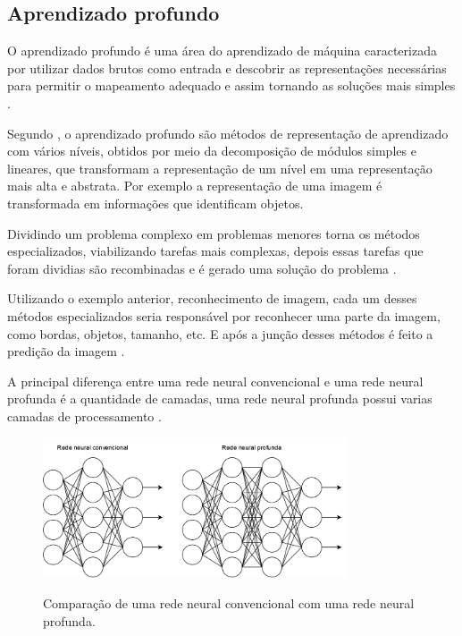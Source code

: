 \subsection{Aprendizado profundo}

O aprendizado profundo é uma área do aprendizado de máquina caracterizada por utilizar dados brutos como entrada e descobrir as representações necessárias para permitir o mapeamento adequado e assim tornando as soluções mais simples .

Segundo , o aprendizado profundo são métodos de representação de aprendizado com vários níveis, obtidos por meio da decomposição de módulos simples e lineares, que transformam a representação de um nível em uma representação mais alta e abstrata. Por exemplo a representação de uma imagem é transformada em informações que identificam objetos.

Dividindo um problema complexo em problemas menores torna os métodos especializados, viabilizando tarefas mais complexas, depois essas tarefas que foram dividias são recombinadas e é gerado uma solução do problema \cite{marti2017aprendizado}.

Utilizando o exemplo anterior, reconhecimento de imagem, cada um desses métodos especializados seria responsável por reconhecer uma parte da imagem, como bordas, objetos, tamanho, etc. E após a junção desses métodos é feito a predição da imagem \cite{marti2017aprendizado}.

A principal diferença entre uma rede neural convencional e uma rede neural profunda é a quantidade de camadas, uma rede neural profunda possui varias camadas de processamento .

\begin{figure}[H]
	\centering
	\caption{Comparação de uma rede neural convencional com uma rede neural profunda.}
	\includegraphics[width=0.8\textwidth]{figures/redes_neurais.png}
	\label{fig:redes_neurais}
\end{figure}
